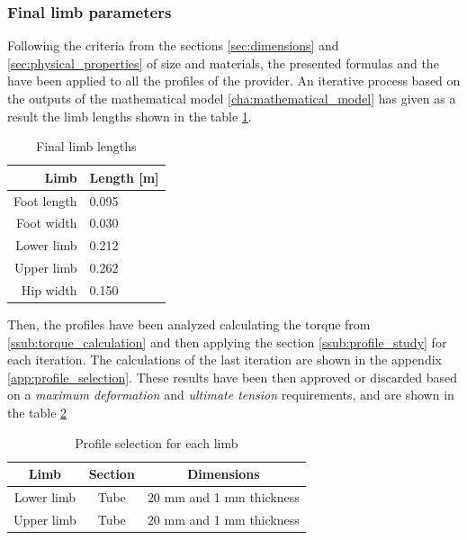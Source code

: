 \subsubsection{Final limb parameters} %
\label{ssub:final_limb_parameters}
Following the criteria from the sections \ref{sec:dimensions} and \ref{sec:physical_properties} of size and materials, the presented formulas and the have been applied to all the profiles of the provider.
An iterative process based on the outputs of the mathematical model \ref{cha:mathematical_model} has given as a result the limb lengths shown in the table \ref{tab:limb_lengths}.

\begin{table}[ht!]
\centering
\caption{Final limb lengths}
\label{tab:limb_lengths}
\begin{tabular}{r|l}
  \textbf{Limb} & \textbf{Length [m]} \\ \hline
  Foot length & 0.095 \\ \hline
  Foot width & 0.030 \\ \hline
  Lower limb & 0.212 \\ \hline
  Upper limb & 0.262 \\ \hline
  Hip width & 0.150     
\end{tabular}
\end{table}

Then, the profiles have been analyzed calculating the torque from \ref{ssub:torque_calculation} and then applying the section \ref{ssub:profile_study} for each iteration.
The calculations of the last iteration are shown in the appendix \ref{app:profile_selection}.
These results have been then approved or discarded based on a \textit{maximum deformation} and \textit{ultimate tension} requirements, and are shown in the table \ref{tab:profile_selection}

\begin{table}[ht!]
\centering
\caption{Profile selection for each limb}
\label{tab:profile_selection}
\begin{tabular}{c|c|c}
  \textbf{Limb} & \textbf{Section} & \textbf{Dimensions} \\ \hline
  Lower limb & Tube & 20 mm and 1 mm thickness \\ \hline
  Upper limb & Tube & 20 mm and 1 mm thickness 
\end{tabular}
\end{table}




